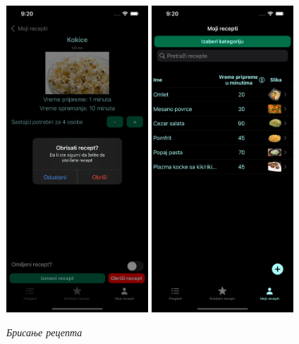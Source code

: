 \documentclass[12pt,oneside]{memoir}
\begin{document}
\begin{figure} [H]
    \centering
    \captionsetup{justification=centering}
    \includegraphics[width=0.475\textwidth]{images/simulators/testing images/delete recipe.png}
    \hfill
    \includegraphics[width=0.475\textwidth]{images/simulators/testing images/deleted recipe.png}
    \caption{\textit{Брисање рецепта}}
    \label{slika:приказ_брисања_рецепта}
\end{figure}
\end{document}
